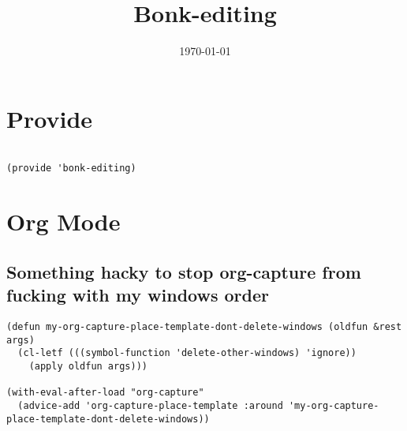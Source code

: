 \documentclass[11pt]{article}
\date{\today}
\title{Bonk-editing}
\begin{document}
\maketitle
\tableofcontents

\section{Provide}
\label{sec:orgf69545d}

\begin{verbatim}

(provide 'bonk-editing)

\end{verbatim}
\section{Org Mode}
\label{sec:orgbf554ec}

\subsection{Something hacky to stop org-capture from fucking with my windows order}
\label{sec:orgbd3073f}
\begin{verbatim}
(defun my-org-capture-place-template-dont-delete-windows (oldfun &rest args)
  (cl-letf (((symbol-function 'delete-other-windows) 'ignore))
    (apply oldfun args)))

(with-eval-after-load "org-capture"
  (advice-add 'org-capture-place-template :around 'my-org-capture-place-template-dont-delete-windows))


\end{verbatim}
\end{document}
